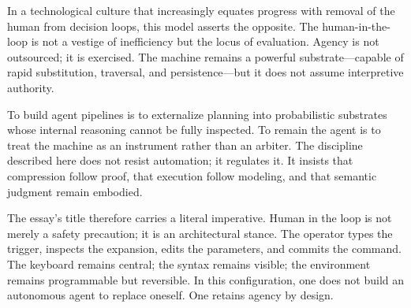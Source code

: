 \documentclass[11pt]{article}
\begin{document}
In a technological culture that increasingly equates progress with removal of the human from decision loops, this model asserts the opposite. The human-in-the-loop is not a vestige of inefficiency but the locus of evaluation. Agency is not outsourced; it is exercised. The machine remains a powerful substrate—capable of rapid substitution, traversal, and persistence—but it does not assume interpretive authority.

To build agent pipelines is to externalize planning into probabilistic substrates whose internal reasoning cannot be fully inspected. To remain the agent is to treat the machine as an instrument rather than an arbiter. The discipline described here does not resist automation; it regulates it. It insists that compression follow proof, that execution follow modeling, and that semantic judgment remain embodied.

The essay’s title therefore carries a literal imperative. Human in the loop is not merely a safety precaution; it is an architectural stance. The operator types the trigger, inspects the expansion, edits the parameters, and commits the command. The keyboard remains central; the syntax remains visible; the environment remains programmable but reversible. In this configuration, one does not build an autonomous agent to replace oneself. One retains agency by design.
\end{document}
